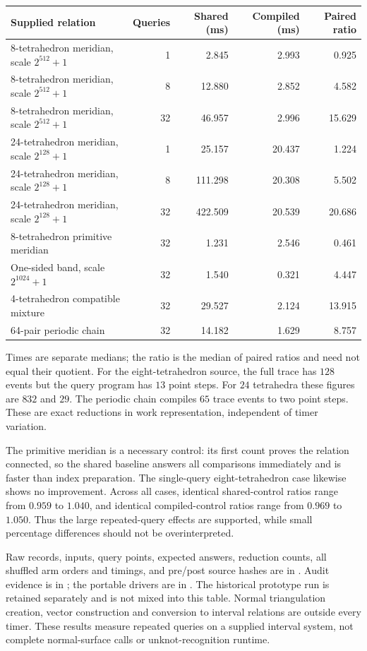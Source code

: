 \begin{center}
\begin{tabular}{lrrrr}
\hline
Supplied relation & Queries & Shared (ms) & Compiled (ms) & Paired ratio\\
\hline
8-tetrahedron meridian, scale $2^{512}+1$ & 1 & 2.845 & 2.993 & 0.925\\
8-tetrahedron meridian, scale $2^{512}+1$ & 8 & 12.880 & 2.852 & 4.582\\
8-tetrahedron meridian, scale $2^{512}+1$ & 32 & 46.957 & 2.996 & 15.629\\
24-tetrahedron meridian, scale $2^{128}+1$ & 1 & 25.157 & 20.437 & 1.224\\
24-tetrahedron meridian, scale $2^{128}+1$ & 8 & 111.298 & 20.308 & 5.502\\
24-tetrahedron meridian, scale $2^{128}+1$ & 32 & 422.509 & 20.539 & 20.686\\
8-tetrahedron primitive meridian & 32 & 1.231 & 2.546 & 0.461\\
One-sided band, scale $2^{1024}+1$ & 32 & 1.540 & 0.321 & 4.447\\
4-tetrahedron compatible mixture & 32 & 29.527 & 2.124 & 13.915\\
64-pair periodic chain & 32 & 14.182 & 1.629 & 8.757\\
\hline
\end{tabular}
\end{center}

Times are separate medians; the ratio is the median of paired ratios and
need not equal their quotient.  For the eight-tetrahedron source, the full
trace has $128$ events but the query program has $13$ point steps.  For
$24$ tetrahedra these figures are $832$ and $29$.  The periodic chain
compiles $65$ trace events to two point steps.  These are exact reductions
in work representation, independent of timer variation.

The primitive meridian is a necessary control: its first count proves the
relation connected, so the shared baseline answers all comparisons
immediately and is faster than index preparation.  The single-query
eight-tetrahedron case likewise shows no improvement.  Across all cases,
identical shared-control ratios range from $0.959$ to $1.040$, and
identical compiled-control ratios range from $0.969$ to $1.050$.  Thus the
large repeated-query effects are supported, while small percentage
differences should not be overinterpreted.

Raw records, inputs, query points, expected answers, reduction counts,
all shuffled arm orders and timings, and pre/post source hashes are in
.  Audit evidence is in
; the portable drivers are in
.  The historical prototype run is retained
separately and is not mixed into this table.  Normal triangulation creation,
vector construction and conversion to interval relations are outside every
timer.  These results measure repeated queries on a supplied interval system,
not complete normal-surface calls or unknot-recognition runtime.
